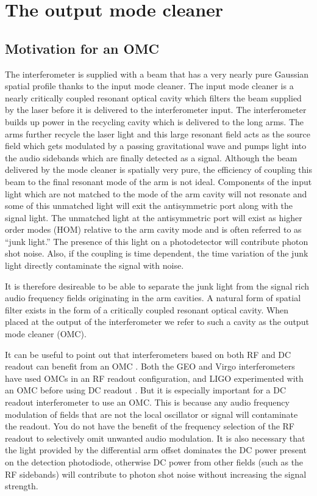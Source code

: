 \chapter{The output mode cleaner}

\section{Motivation for an OMC}
The interferometer is supplied with a beam that has a very nearly pure Gaussian spatial profile thanks to the input mode cleaner. %
The input mode cleaner is a nearly critically coupled resonant optical cavity which filters the beam supplied by the laser before it is delivered to the interferometer input. %
The interferometer builds up power in the recycling cavity which is delivered to the long arms. %
The arms further recycle the laser light and this large resonant field acts as the source field which gets modulated by a passing gravitational wave and pumps light into the audio sidebands which are finally detected as a signal. %
Although the beam delivered by the mode cleaner is spatially very pure, the efficiency of coupling this beam to the final resonant mode of the arm is not ideal. %
Components of the input light which are not matched to the mode of the arm cavity will not resonate and some of this unmatched light will exit the antisymmetric port along with the signal light. %
The unmatched light at the antisymmetric port will exist as higher order modes (HOM) relative to the arm cavity mode and is often referred to as ``junk light.'' %
The presence of this light on a photodetector will contribute photon shot noise. %
Also, if the coupling is time dependent, the time variation of the junk light directly contaminate the signal with noise.

It is therefore desireable to be able to separate the junk light from the signal rich audio frequency fields originating in the arm cavities. %
A natural form of spatial filter exists in the form of a critically coupled resonant optical cavity. %
When placed at the output of the interferometer we refer to such a cavity as the output mode cleaner (OMC).

It can be useful to point out that interferometers based on both RF and DC readout can benefit from an OMC . %
Both the GEO and Virgo interferometers have used OMCs in an RF readout configuration, and LIGO experimented with an OMC before using DC readout \cite{some things}. %
But it is especially important for a DC readout interferometer to use an OMC. %
This is because any audio frequency modulation of fields that are not the local oscillator or signal will contaminate the readout. %
You do not have the benefit of the frequency selection of the RF readout to selectively omit unwanted audio modulation. %
It is also necessary that the light provided by the differential arm offset dominates the DC power present on the detection photodiode, otherwise DC power from other fields (such as the RF sidebands) will contribute to photon shot noise without increasing the signal strength.



